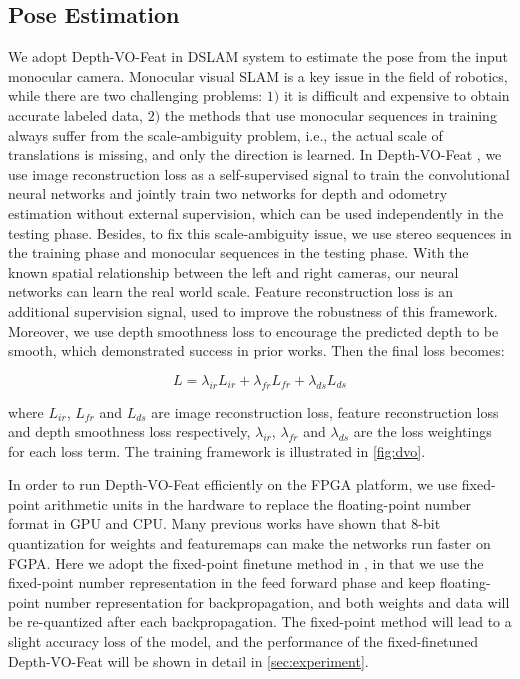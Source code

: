\subsection{Pose Estimation}
We adopt Depth-VO-Feat \cite{Zhan:2018e92} in DSLAM system to estimate the pose from the input monocular camera. Monocular visual SLAM is a key issue in the field of robotics, while there are two challenging problems: $1)$ it is difficult and expensive to obtain accurate labeled data, $2)$ the methods that use monocular sequences in training always suffer from the scale-ambiguity problem, i.e., the actual scale of translations is missing, and only the direction is learned. In Depth-VO-Feat \cite{Zhan:2018e92}, we use image reconstruction loss as a self-supervised signal to train the convolutional neural networks and jointly train two networks for depth and odometry estimation without external supervision, which can be used independently in the testing phase. Besides, to fix this scale-ambiguity issue, we use stereo sequences in the training phase and monocular sequences in the testing phase. With the known spatial relationship between the left and right cameras, our neural networks can learn the real world scale. Feature reconstruction loss is an additional supervision signal, used to improve the robustness of this framework. Moreover, we use depth smoothness loss to encourage the predicted depth to be smooth, which demonstrated success in prior works. Then the final loss becomes:

\begin{equation}
    L=\lambda_{ir}L_{ir}+\lambda_{fr}L_{fr}+\lambda_{ds}L_{ds}
    \label{equ:loss}
\end{equation}

where $L_{ir}$, $L_{fr}$ and $L_{ds}$ are image reconstruction loss, feature reconstruction loss and depth smoothness loss respectively, $\lambda_{ir}$, $\lambda_{fr}$ and $\lambda_{ds}$ are the loss weightings for each loss term. The training framework is illustrated in \cref{fig:dvo}.


In order to run Depth-VO-Feat efficiently on the FPGA platform, we use fixed-point arithmetic units in the hardware to replace the floating-point number format in GPU and CPU. Many previous works have shown that 8-bit quantization for weights and featuremaps can make the networks run faster on FGPA. Here we adopt the fixed-point finetune method in \cite{Yu:2018:IDC:3299999.3283452}, in that we use the fixed-point number representation in the feed forward phase and keep floating-point number representation for backpropagation, and both weights and data will be re-quantized after each backpropagation. The fixed-point method will lead to a slight accuracy loss of the model, and the performance of the fixed-finetuned Depth-VO-Feat will be shown in detail in \cref{sec:experiment}.

